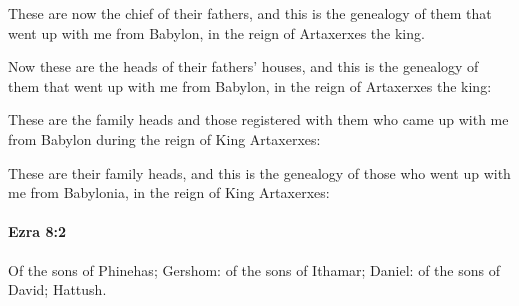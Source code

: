 			These are now the chief of their fathers, and this is the genealogy of them that went up with me from Babylon, in the reign of Artaxerxes the king.

			\begin{versebox}
					\item[BHS] 
					\item[LXX] 
					\item[ASV] Now these are the heads of their fathers' houses, and this is the genealogy of them that went up with me from Babylon, in the reign of Artaxerxes the king:
					\item[NIV] These are the family heads and those registered with them who came up with me from Babylon during the reign of King Artaxerxes:
					\item[NRSV] These are their family heads, and this is the genealogy of those who went up with me from Babylonia, in the reign of King Artaxerxes:
			\end{versebox}

		\paragraph{Ezra 8:2} %
			\label{EZRA-8-2}

			Of the sons of Phinehas; Gershom: of the sons of Ithamar; Daniel: of the sons of David; Hattush.

